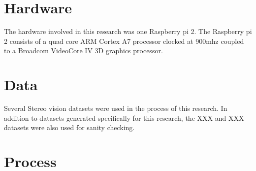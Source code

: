
\section{Hardware}
The hardware involved in this research was one Raspberry pi 2.  The Raspberry pi 2 consists of a quad core ARM Cortex A7 processor clocked at 900mhz coupled to a Broadcom VideoCore IV 3D graphics processor.
\section{Data}
Several Stereo vision datasets were used in the process of this research.  In addition to datasets generated specifically for this research, the XXX and XXX datasets were also used for sanity checking.
\section{Process}

